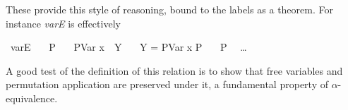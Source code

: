 These provide this style of reasoning, bound to the labels as a theorem.
For instance \emph{varE} is effectively

\begin{implementation}
\isamarkupfalse%
\ varE\isanewline
\ \ \ P\isanewline
\ \ \ {\isachardoublequoteopen}PVar x\ {\isasymapprox}\ Y{\isachardoublequoteclose}\isanewline
\ \ \ {\isachardoublequoteopen}Y = PVar x {\isasymLongrightarrow} P{\isachardoublequoteclose}\isanewline
\ \ \ {\isachardoublequoteopen}P{\isachardoublequoteclose}\isanewline
{}\isanewline
\ \ \ldots\isanewline
{}\isanewline
\end{implementation}

A good test of the definition of this relation is to show that free variables and permutation application are preserved under it, a fundamental property of \(\alpha\)-equivalence.

